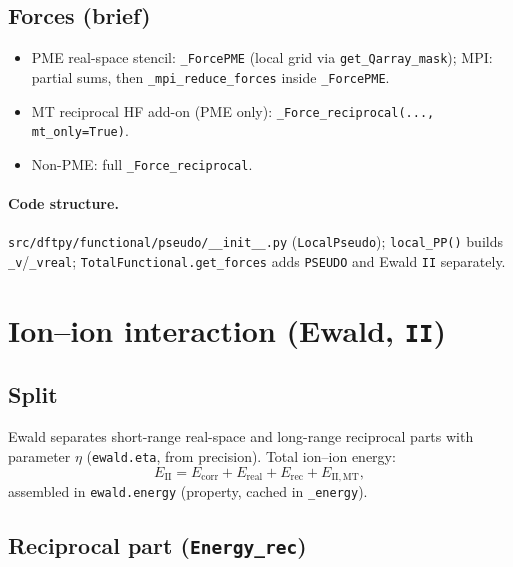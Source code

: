 \documentclass[11pt,a4paper]{article}
\begin{document}
\subsection{Forces (brief)}

\begin{itemize}
  \item PME real-space stencil: \texttt{\_ForcePME} (local grid via \texttt{get\_Qarray\_mask});
        MPI: partial sums, then \texttt{\_mpi\_reduce\_forces} inside \texttt{\_ForcePME}.
  \item MT reciprocal HF add-on (PME only): \texttt{\_Force\_reciprocal(..., mt\_only=True)}.
  \item Non-PME: full \texttt{\_Force\_reciprocal}.
\end{itemize}

\paragraph{Code structure.}
\texttt{src/dftpy/functional/pseudo/\_\_init\_\_.py} (\texttt{LocalPseudo});
\texttt{local\_PP()} builds \texttt{\_v}/\texttt{\_vreal};
\texttt{TotalFunctional.get\_forces} adds \texttt{PSEUDO} and Ewald \texttt{II} separately.

\section{Ion--ion interaction (Ewald, \texttt{II})}

\subsection{Split}

Ewald separates short-range real-space and long-range reciprocal parts with parameter $\eta$
(\texttt{ewald.eta}, from precision). Total ion--ion energy:
\begin{equation}
  E_{\mathrm{II}} = E_{\mathrm{corr}} + E_{\mathrm{real}} + E_{\mathrm{rec}} + E_{\mathrm{II,MT}},
\end{equation}
assembled in \texttt{ewald.energy} (property, cached in \texttt{\_energy}).

\subsection{Reciprocal part (\texttt{Energy\_rec})}
\end{document}
